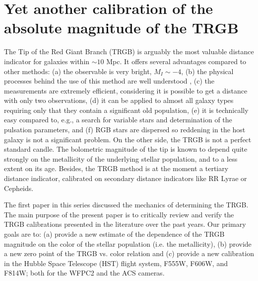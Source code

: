 \documentclass[11pt,preprint2]{aastex}
\begin{document}
\section{Yet another calibration of the absolute magnitude of the TRGB}

The Tip of the Red Giant Branch (TRGB) is arguably  the most valuable distance indicator for galaxies within $\sim 10$ Mpc. It offers several advantages compared to other methods: (a) the observable is very bright, $M_I \sim -4$, (b) the physical processes behind the use of this method are well understood \citep{1997MNRAS.289..406S, 1997eds..proc..239M, 2002PASP..114..375S}, (c) the measurements are extremely efficient, considering it is possible to get a distance with only two observations, (d) it can be applied to almost all galaxy types requiring only that  they contain a significant old population, (e) it is technically easy compared to, e.g., a search for variable stars and determination of the pulsation parameters, and (f) RGB stars are dispersed so reddening in the host galaxy is not a significant problem.
On the other side, the TRGB is not a perfect standard candle. The bolometric magnitude of the tip is known to depend quite strongly on the metallicity of the underlying stellar population, and to a less extent on its age. Besides, the TRGB method is at the moment a tertiary distance indicator, calibrated on secondary distance indicators like RR Lyrae or Cepheids.

The first paper in this series \citep[][:Paper I]{2006AJ....132.2729M} discussed the mechanics of determining the TRGB.
The main purpose of the present paper is to critically review and verify the TRGB calibrations presented in the literature over the past years. Our primary goals are to: (a) provide a new estimate of the dependence of the TRGB magnitude on the color of the stellar population (i.e. the metallicity), (b) provide a new zero point of the TRGB vs. color relation and (c) provide a new calibration in the Hubble Space Telescope (HST) flight system, F555W, F606W, and F814W; both for the WFPC2 and the ACS cameras.
\end{document}
